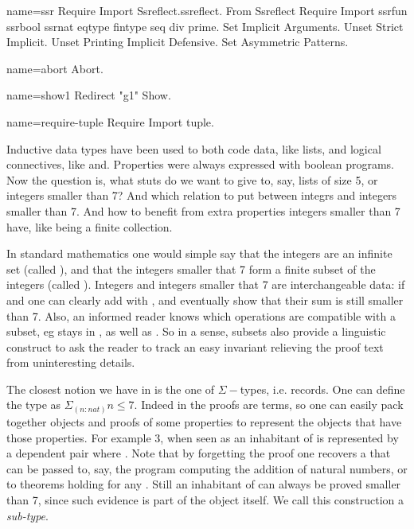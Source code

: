 \begin{coqdef}{name=ssr}
Require Import Ssreflect.ssreflect.
From Ssreflect Require Import ssrfun ssrbool ssrnat eqtype fintype seq div prime.
Set Implicit Arguments.
Unset Strict Implicit.
Unset Printing Implicit Defensive.
Set Asymmetric Patterns.
\end{coqdef}
\begin{coqdef}{name=abort}
Abort.
\end{coqdef}
\begin{coqdef}{name=show1}
Redirect "g1" Show.
\end{coqdef}
\begin{coqdef}{name=require-tuple}
Require Import tuple.
\end{coqdef}

\label{ch:sigmabool}

Inductive data types have been used to both code data, like lists, and
logical connectives, like and.  Properties were always expressed with
boolean programs.  Now the question is, what stuts do we want to give
to, say, lists of size 5,  or integers smaller than 7?  And which
relation to put between integrs and integers smaller than 7.  And how
to benefit from extra properties integers smaller than 7 have, like
being a finite collection.

In standard mathematics one would simple say that the integers are an
infinite set (called ), and that the integers smaller that 7
form a finite subset of the integers (called ).  Integers and
integers smaller that 7 are interchangeable data: if  and
 one can clearly add  with , and eventually show
that their sum is still smaller than 7.  Also, an informed reader
knows which operations are compatible with a subset, eg 
stays in , as well as .  So in a sense, subsets
also provide a linguistic construct to ask the reader to track an
easy invariant relieving the proof text from uninteresting details.

The closest notion we have in \mcbCIC{} is the one of $\Sigma-$types,
i.e. records.  One can define the type  as $\Sigma_{(n:nat)} n
\leq 7.$  Indeed in the \mcbCIC{} proofs are terms, so one can easily
pack together objects and proofs of some properties to
represent the objects that have those properties.  For example $3$,
when seen as an inhabitant of  is represented by a dependent
pair  where .  Note that by forgetting the
proof  one recovers a  that can be passed to, say, the
program computing the addition of natural numbers, or to theorems
holding for any .  Still an inhabitant of  can always
be proved smaller than 7, since such evidence is part of the
object itself.
We call this construction a \emph{sub-type}.

